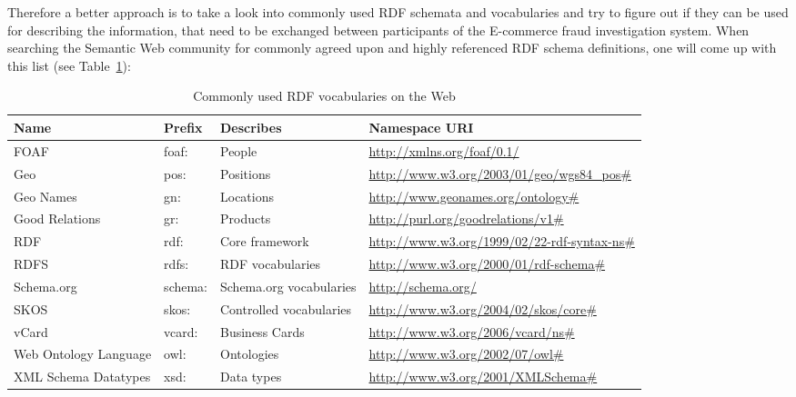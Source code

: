 Therefore a better approach is to take a look into commonly used \gls{RDF} schemata and vocabularies and try to figure out if they can be used for describing the information, that need to be exchanged between participants of the \gls{E-commerce} fraud investigation system. When searching the Semantic Web community for commonly agreed upon and highly referenced \gls{RDF} schema definitions, one will come up with this list (see Table~\ref{tab:used_vocab_rdf}):\@

\begin{table}[]
\centering
\begin{tabular}{p{3cm}llp{4.5cm}}
\hline
\multicolumn{1}{l}{\textbf{Name}} & \multicolumn{1}{l}{\textbf{Prefix}} & \multicolumn{1}{l}{\textbf{Describes}} & \multicolumn{1}{l}{\textbf{Namespace URI}} \\
\hline
FOAF & foaf: & People & \url{http://xmlns.org/foaf/0.1/} \\
\hline
Geo & pos: & Positions & \url{http://www.w3.org/2003/01/geo/wgs84\_pos\#} \\
\hline
Geo Names & gn: & Locations & \url{http://www.geonames.org/ontology\#} \\
\hline
Good Relations & gr: & Products & \url{http://purl.org/goodrelations/v1\#} \\
\hline
RDF & rdf: & Core framework & \url{http://www.w3.org/1999/02/22-rdf-syntax-ns\#} \\
\hline
RDFS & rdfs: & RDF vocabularies & \url{http://www.w3.org/2000/01/rdf-schema\#} \\
\hline
Schema.org & schema: & Schema.org vocabularies & \url{http://schema.org/} \\
\hline
SKOS & skos: & Controlled vocabularies & \url{http://www.w3.org/2004/02/skos/core\#} \\
\hline
vCard & vcard: & Business Cards & \url{http://www.w3.org/2006/vcard/ns\#} \\
\hline
Web Ontology Language & owl: & Ontologies & \url{http://www.w3.org/2002/07/owl\#} \\
\hline
XML Schema Datatypes & xsd: & Data types & \url{http://www.w3.org/2001/XMLSchema\#} \\
\hline
\end{tabular}
\caption{Commonly used \gls{RDF} vocabularies on the Web \citep[pg. 41]{wood2014linked}}
\label{tab:used_vocab_rdf}
\end{table}


